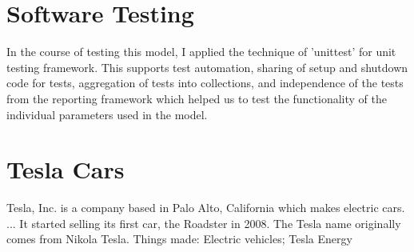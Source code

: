 \documentclass{book}
\begin{document}
\section{Software Testing}

In the course of testing this model, I applied the technique of 'unittest' for unit testing framework. This supports test automation, sharing of setup and shutdown code for tests, aggregation of tests into collections, and independence of the tests from the reporting framework which helped us to test the functionality of the individual parameters used in the model.

\section{ Tesla Cars}
Tesla, Inc. is a company based in Palo Alto, California which makes electric cars. ... It started selling its first car, the Roadster in 2008. The Tesla name originally comes from Nikola Tesla.
Things made: Electric vehicles; Tesla Energy



\end{document}
